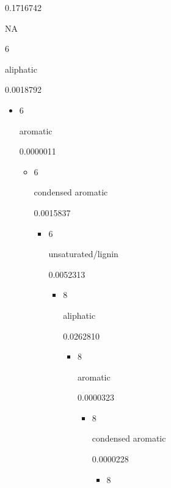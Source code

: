 \documentclass[
]{article}
\begin{document}
\begin{itemize}
\begin{itemize}
\begin{itemize}
\begin{itemize}
\begin{itemize}
\begin{itemize}
\begin{itemize}
              0.1716742

              NA

              6

              aliphatic

              0.0018792

              \begin{itemize}
              \item
                6

                aromatic

                0.0000011

                \begin{itemize}
                \item
                  6

                  condensed aromatic

                  0.0015837

                  \begin{itemize}
                  \item
                    6

                    unsaturated/lignin

                    0.0052313

                    \begin{itemize}
                    \item
                      8

                      aliphatic

                      0.0262810

                      \begin{itemize}
                      \item
                        8

                        aromatic

                        0.0000323

                        \begin{itemize}
                        \item
                          8

                          condensed aromatic

                          0.0000228

                          \begin{itemize}
                          \item
                            8


\end{itemize}
\end{itemize}
\end{itemize}
\end{itemize}
\end{itemize}
\end{itemize}
\end{itemize}
\end{itemize}
\end{itemize}
\end{itemize}
\end{itemize}
\end{itemize}
\end{itemize}
\end{itemize}
\end{document}
